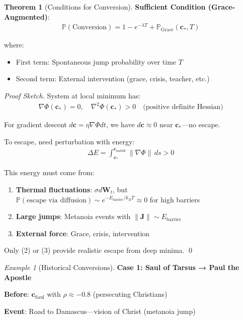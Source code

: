 \documentclass[11pt,a4paper]{article}
\theoremstyle{definition}
\newtheorem{theorem}{Theorem}[section]
\theoremstyle{remark}
\newtheorem{example}{Example}[section]
\newcommand{\cc}{\mathbf{c}}
\begin{document}
\begin{small}
\begin{enumerate}
\begin{theorem}[Conditions for Conversion]
\textbf{Sufficient Condition (Grace-Augmented)}:
\begin{align}
\mathbb{P}(\text{Conversion}) = 1 - e^{-\lambda T} + \mathbb{P}_{\text{Grace}}(\cc_*, T)
\end{align}

where:
\begin{itemize}
    \item First term: Spontaneous jump probability over time \(T\)
    \item Second term: External intervention (grace, crisis, teacher, etc.)
\end{itemize}
\end{theorem}

\begin{proof}[Proof Sketch]
System at local minimum has:
\begin{align}
\nabla \Phi(\cc_*) = 0, \quad \nabla^2 \Phi(\cc_*) > 0 \quad \text{(positive definite Hessian)}
\end{align}

For gradient descent \(d\cc = \eta \nabla \Phi dt\), we have \(d\cc \approx 0\) near \(\cc_*\)—no escape.

To escape, need perturbation with energy:
\begin{align}
\Delta E = \int_{\cc_*}^{\cc_{\text{saddle}}} \|\nabla \Phi\| \, ds > 0
\end{align}

This energy must come from:
\begin{enumerate}
    \item \textbf{Thermal fluctuations}: \(\sigma d\mathbf{W}_t\), but \(\mathbb{P}(\text{escape via diffusion}) \sim e^{-E_{\text{barrier}}/k_B T} \approx 0\) for high barriers
    \item \textbf{Large jumps}: Metanoia events with \(\|\mathbf{J}\| \sim E_{\text{barrier}}\)
    \item \textbf{External force}: Grace, crisis, intervention
\end{enumerate}

Only (2) or (3) provide realistic escape from deep minima. \qed
\end{proof}

\begin{example}[Historical Conversions]
\textbf{Case 1: Saul of Tarsus → Paul the Apostle}

\textbf{Before}: \(\cc_{\text{Saul}}\) with \(\rho \approx -0.8\) (persecuting Christians)

\textbf{Event}: Road to Damascus—vision of Christ (metanoia jump)


\end{example}
\end{enumerate}
\end{small}
\end{document}
